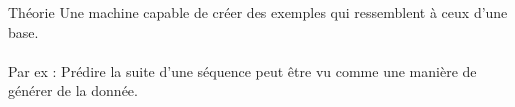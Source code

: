 \begin{frame}{Théorie}
    Une machine capable de créer des exemples qui ressemblent à ceux d'une base.\\
    \\
    Par ex : Prédire la suite d'une séquence peut être vu comme une manière de générer de la donnée.
\end{frame}
